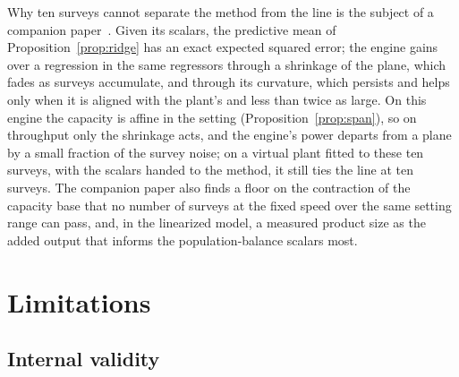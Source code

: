 \documentclass[journal]{IEEEtran}
\begin{document}
Why ten surveys cannot separate the method from the line is the subject of a companion paper~\cite{cbtheory}. Given its
scalars, the predictive mean of Proposition~\ref{prop:ridge} has an exact expected squared error; the engine gains over a
regression in the same regressors through a shrinkage of the plane, which fades as surveys accumulate, and through its
curvature, which persists and helps only when it is aligned with the plant's and less than twice as large. On this engine
the capacity is affine in the setting (Proposition~\ref{prop:span}), so on throughput only the shrinkage acts, and the
engine's power departs from a plane by a small fraction of the survey noise; on a virtual plant fitted to these ten
surveys, with the scalars handed to the method, it still ties the line at ten surveys. The companion paper also finds a
floor on the contraction of the capacity base that no number of surveys at the fixed speed over the same setting range can
pass, and, in the linearized model, a measured product size as the added output that informs the population-balance scalars
most.

\section{Limitations}\label{sec:limitations}

\subsection{Internal validity}
\end{document}
